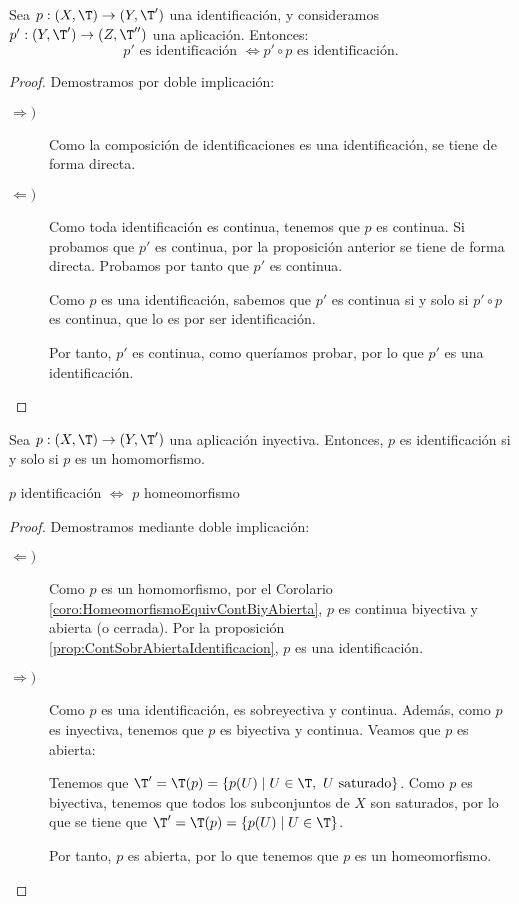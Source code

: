 \begin{prop}
    Sea $p:(X,\T)\to (Y,\T')$ una identificación, y consideramos $p':(Y,\T')\to (Z,\T'')$ una aplicación. Entonces:
    \begin{equation*}
        p' \text{ es identificación }\Longleftrightarrow p'\circ p \text{ es identificación.}
    \end{equation*}
\end{prop}
\begin{proof} Demostramos por doble implicación:
\begin{description}
    \item[$\Longrightarrow)$] Como la composición de identificaciones es una identificación, se tiene de forma directa.

    \item[$\Longleftarrow)$] Como toda identificación es continua, tenemos que $p$ es continua. Si probamos que $p'$ es continua, por la proposición anterior se tiene de forma directa. Probamos por tanto que $p'$ es continua.

    Como $p$ es una identificación, sabemos que $p'$ es continua si y solo si $p'\circ p$ es continua, que lo es por ser identificación.

    Por tanto, $p'$ es continua, como queríamos probar, por lo que $p'$ es una identificación.
\end{description}
\end{proof}

\begin{prop}
    Sea $p:(X,\T)\to (Y,\T')$ una aplicación inyectiva. Entonces, $p$ es identificación si y solo si $p$ es un homomorfismo.
    \begin{center}
        $p$ identificación $\Longleftrightarrow$ $p$ homeomorfismo
    \end{center}
\end{prop}
\begin{proof} Demostramos mediante doble implicación:
    \begin{description}
        \item[$\Longleftarrow)$] Como $p$ es un homomorfismo, por el Corolario \ref{coro:HomeomorfismoEquivContBiyAbierta}, $p$ es continua biyectiva y abierta (o cerrada). Por la proposición \ref{prop:ContSobrAbiertaIdentificacion}, $p$ es una identificación. 

        \item[$\Longrightarrow)$] Como $p$ es una identificación, es sobreyectiva y continua. Además, como $p$ es inyectiva, tenemos que $p$ es biyectiva y continua. Veamos que $p$ es abierta:

        Tenemos que $\T'=\T(p) = \{p(U)\mid U\in \T,~ U\text{ saturado}\}$. Como $p$ es biyectiva, tenemos que todos los subconjuntos de $X$ son saturados, por lo que se tiene que $\T'=\T(p) = \{p(U)\mid U\in \T\}$.

        Por tanto, $p$ es abierta, por lo que tenemos que $p$ es un homeomorfismo.
    \end{description}
\end{proof}

